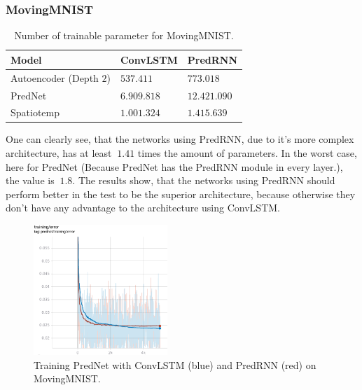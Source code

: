   \subsubsection{MovingMNIST}
   \begin{table}[H]
    \begin{center}
     \begin{tabular}{| l | l | l |}\hline
      \textbf{Model} & \textbf{ConvLSTM} & \textbf{PredRNN} \\\hline
      Autoencoder (Depth $2$) & $537.411$ & $773.018$ \\\hline
      PredNet & $6.909.818$ & $12.421.090$ \\\hline
      Spatiotemp & $1.001.324$ & $1.415.639$ \\\hline
     \end{tabular}
    \end{center}
    \caption{Number of trainable parameter for MovingMNIST.}
   \end{table}\noindent
   One can clearly see, that the networks using PredRNN, due to it's more complex architecture, has at least $~1.41$ times the amount of parameters. In the worst
   case, here for PredNet (Because PredNet has the PredRNN module in every layer.), the value is $~1.8$. The results show, that the networks using PredRNN
   should perform better in the test to be the superior architecture, because otherwise they don't have any advantage to the architecture using ConvLSTM.
   \begin{figure}[H]
    \includegraphics[width=0.45\textwidth]{../Images/prednet_mnist_training.png}
    \centering
    \caption{Training PredNet with ConvLSTM (blue) and PredRNN (red) on MovingMNIST.}
    \label{fig:prednet_mnist_training}
   \end{figure}\noindent
